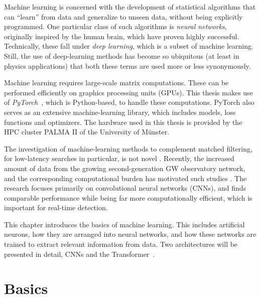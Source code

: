 Machine learning is concerned with the development of statistical algorithms that can \enquote{learn} from data and generalize to unseen data, without being explicitly programmed. One particular class of such algorithms is \emph{neural networks}, originally inspired by the human brain, which have proven highly successful. 
Technically, these fall under \emph{deep learning}, which is a subset of machine learning. Still, the use of deep-learning methods has become so ubiquitous (at least in physics applications) that both these terms are used more or less synonymously. 

Machine learning requires large-scale matrix computations. These can be performed efficiently on graphics processing units (GPUs). This thesis makes use of \emph{PyTorch}~\cite{paszke2019pytorchimperativestylehighperformance}, which is Python-based, to handle these computations. PyTorch also serves as an extensive machine-learning library, which includes models, loss functions and optimizers.
The hardware used in this thesis is provided by the HPC cluster PALMA II of the University of Münster.


The investigation of machine-learning methods to complement matched filtering, for low-latency searches in particular, is not novel \cite{George_2018}. Recently, the increased amount of data from the growing second-generation GW observatory network, and the corresponding computational burden has motivated such studies \cite{PhysRevD.100.063015}. The research focuses primarily on convolutional neural networks (CNNs), and finds comparable performance while being far more computationally efficient, which is important for real-time detection.

This chapter introduces the basics of machine learning. This includes artificial neurons, how they are arranged into neural networks, and how these networks are trained to extract relevant information from data. Two architectures will be presented in detail, CNNs and the Transformer~\cite{NIPS2017_3f5ee243}.

\section{Basics}

